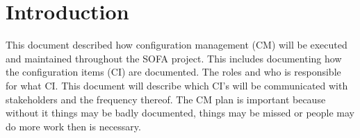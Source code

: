 \chapter{Introduction}
This document described how configuration management (CM) will be executed and maintained throughout the SOFA project. This includes documenting how the configuration items (CI) are documented. The roles and who is responsible for what CI. This document will describe which CI's will be communicated with stakeholders and the frequency thereof. The CM plan is important because without it things may be badly documented, things may be missed or people may do more work then is necessary.


